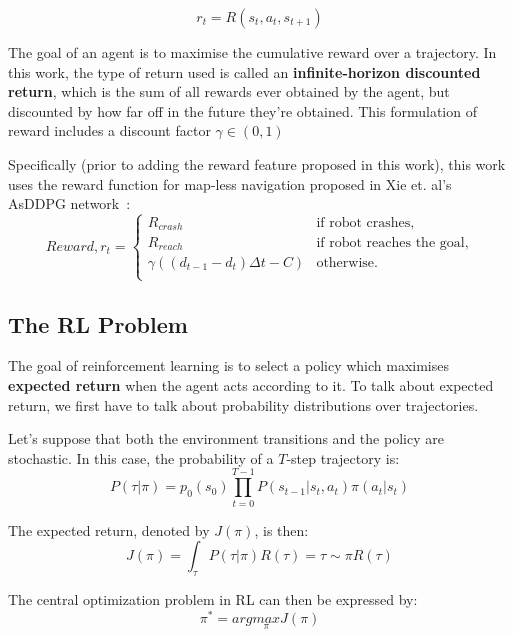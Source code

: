 \begin{equation}
r_{t} = R(s_{t}, a_{t}, s_{t+1})
\end{equation}

The goal of an agent is to maximise the cumulative reward over a trajectory. In this work, the type of return used is called an \textbf{infinite-horizon discounted return}, which is the sum of all rewards ever obtained by the agent, but discounted by how far off in the future they're obtained. This formulation of reward includes a discount factor $\gamma \in (0, 1)$

Specifically (prior to adding the reward feature proposed in this work), this work uses the reward function for map-less navigation proposed in Xie et. al's AsDDPG network~\cite{xie_learning_2018}:
\begin{equation*}
Reward, r_{t} = 
\begin{cases}
  R_{crash}& \text{if robot crashes},\\   
  R_{reach}& \text{if robot reaches the goal},\\  
  \gamma{((d_{t-1} - d_{t})\Delta{t} - C)}& \text{otherwise}.\\  
\end{cases}
\end{equation*}

\subsection{The RL Problem}
The goal of reinforcement learning is to select a policy which maximises \textbf{expected return} when the agent acts according to it. To talk about expected return, we first have to talk about probability distributions over trajectories.

Let’s suppose that both the environment transitions and the policy are stochastic. In this case, the probability of a $T$-step trajectory is:
\begin{equation}
P(\tau|\pi) = p_{0}(s_{0}) \prod_{t=0}^{T-1} P(s_{t-1}|s_{t}, a_{t}) \pi(a_{t}|s_{t})
\end{equation}

The expected return, denoted by $J(\pi)$, is then:
\begin{equation}
J(\pi) = \int_{\tau} P(\tau|\pi) R(\tau) = \tau \sim \pi R(\tau)
\end{equation}

The central optimization problem in RL can then be expressed by:
\begin{equation}
\pi^{*} = arg\underset{\pi}{max} J(\pi)
\end{equation}

